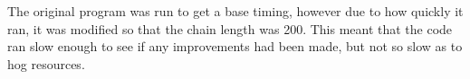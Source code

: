 \documentclass[a4paper,12pt,openany]{report}
\begin{document}
The original program was run to get a base timing, however due to how quickly it ran, it was modified so that the chain length was 200.
This meant that the code ran slow enough to see if any improvements had been made, but not so slow as to hog resources.

\end{document}
